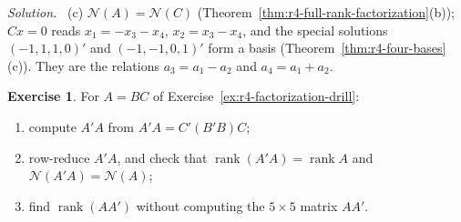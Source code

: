 \documentclass[12pt]{article}
\DeclareMathOperator{\rank}{rank}
\theoremstyle{definition}
\newtheorem{exercise}{Exercise}
\newenvironment{solution}{\par\noindent\textit{Solution.}\ }{\par\smallskip}
\begin{document}
\begin{solution}
(c) \(\mathcal N(A)=\mathcal N(C)\) (Theorem~\ref{thm:r4-full-rank-factorization}(b)); \(Cx=0\) reads
\(x_1=-x_3-x_4\), \(x_2=x_3-x_4\), and the special solutions \((-1,1,1,0)'\) and \((-1,-1,0,1)'\)
form a basis (Theorem~\ref{thm:r4-four-bases}(c)). They are the relations \(a_3=a_1-a_2\) and \(a_4=a_1+a_2\).
\end{solution}

\begin{exercise}\label{ex:r4-gram-drill}
For \(A=BC\) of Exercise~\ref{ex:r4-factorization-drill}:
\begin{enumerate}
\item compute \(A'A\) from \(A'A=C'(B'B)C\);
\item row-reduce \(A'A\), and check that \(\rank(A'A)=\rank A\) and \(\mathcal N(A'A)=\mathcal N(A)\);
\item find \(\rank(AA')\) without computing the \(5\times5\) matrix \(AA'\).
\end{enumerate}
\end{exercise}
\end{document}
